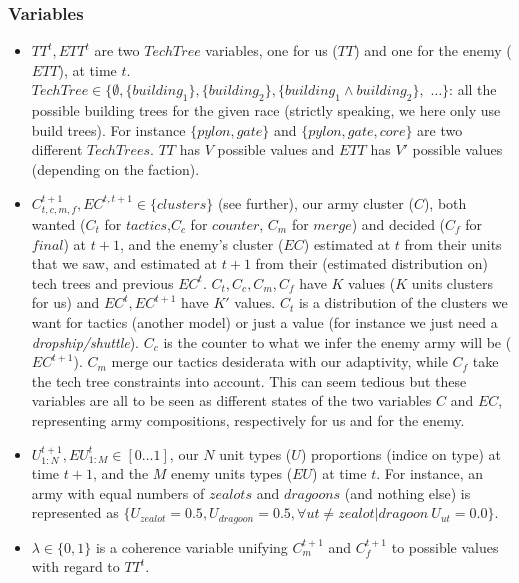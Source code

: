 \subsubsection{Variables}
\begin{itemize}
    \item $TT^t, ETT^t$ are two $TechTree$ variables, one for us ($TT$) and one for the enemy ($ETT$), at time $t$. $TechTree \in \{\emptyset, \{building_1\}, \{building_2\}, \{building_1\wedge building_2\},$ $\dots\}$: all the possible building trees for the given race (strictly speaking, we here only use build trees). For instance $\{pylon, gate\}$ and $\{pylon, gate, core\}$ are two different $TechTrees$. $TT$ has $V$ possible values and $ETT$ has $V'$ possible values (depending on the faction).
    \item $C_{t,c,m,f}^{t+1}, EC^{t,t+1} \in \{clusters\}$ (see further), our army cluster ($C$), both wanted ($C_{t}$ for $tactics$,$C_{c}$ for $counter$, $C_{m}$ for $merge$) and decided ($C_{f}$ for $final$) at $t+1$, and the enemy's cluster ($EC$) estimated at $t$ from their units that we saw, and estimated at $t+1$ from their (estimated distribution on) tech trees and previous $EC^t$. $C_{t},C_{c},C_{m},C_{f}$ have $K$ values ($K$ units clusters for us) and $EC^t, EC^{t+1}$ have $K'$ values. $C_t$ is a distribution of the clusters we want for tactics (another model) or just a value (for instance we just need a \textit{dropship/shuttle}). $C_c$ is the counter to what we infer the enemy army will be ($EC^{t+1}$). $C_m$ merge our tactics desiderata with our adaptivity, while $C_f$ take the tech tree constraints into account. This can seem tedious but these variables are all to be seen as different states of the two variables $C$ and $EC$, representing army compositions, respectively for us and for the enemy.
    \item $U_{1:N}^{t+1}, EU_{1:M}^t \in [0\dots 1]$, our $N$ unit types ($U$) proportions (indice on type) at time $t+1$, and the $M$ enemy units types ($EU$) at time $t$. For instance, an army with equal numbers of $zealots$ and $dragoons$ (and nothing else) is represented as $\{U_{zealot}=0.5, U_{dragoon}=0.5, \forall ut \neq zealot|dragoon\ U_{ut}=0.0\}$.
    \item $\lambda \in \{0, 1\}$ is a coherence variable unifying $C_{m}^{t+1}$ and $C_{f}^{t+1}$ to possible values with regard to $TT^t$.
\end{itemize}

